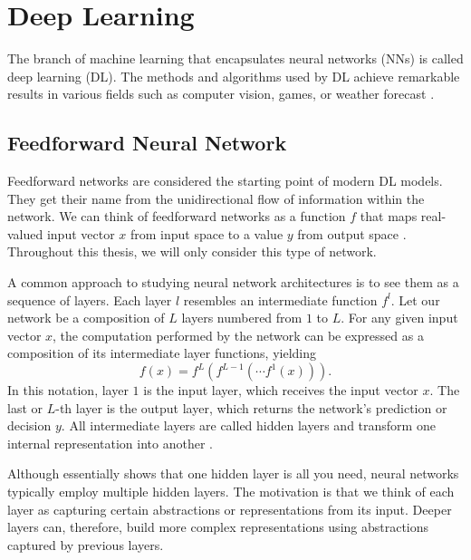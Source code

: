 \section{Deep Learning}\label{section:dl}

The branch of machine learning that encapsulates neural networks (NNs) is called deep learning (DL).
The methods and algorithms used by DL achieve remarkable results in various fields such as computer vision, games, or weather forecast \cite{alexnet, alphago, weather}.

\subsection*{Feedforward Neural Network}\label{feedforward-nn}

Feedforward networks are considered the starting point of modern DL models.
They get their name from the unidirectional flow of information within the network.
We can think of feedforward networks as a function $f$ that maps real-valued input vector $x$ from input space to a value $y$ from output space \cite{goodfellow}.
Throughout this thesis, we will only consider this type of network.

A common approach to studying neural network architectures is to see them as a sequence of layers.
Each layer $l$ resembles an intermediate function $f^l$.
Let our network be a composition of $L$ layers numbered from $1$ to $L$.
For any given input vector $x$, the computation performed by the network can be expressed as a composition of its intermediate layer functions, yielding
\begin{equation}
    f(x) = f^L(f^{L-1}(\cdots f^1(x))).
\end{equation}
In this notation, layer $1$ is the input layer, which receives the input vector $x$.
The last or $L$-th layer is the output layer, which returns the network's prediction or decision $y$.
All intermediate layers are called hidden layers and transform one internal representation into another \cite{goodfellow}.

Although \cite{cybenko} essentially shows that one hidden layer is all you need, neural networks typically employ multiple hidden layers.
The motivation is that we think of each layer as capturing certain abstractions or representations from its input.
Deeper layers can, therefore, build more complex representations using abstractions captured by previous layers.

